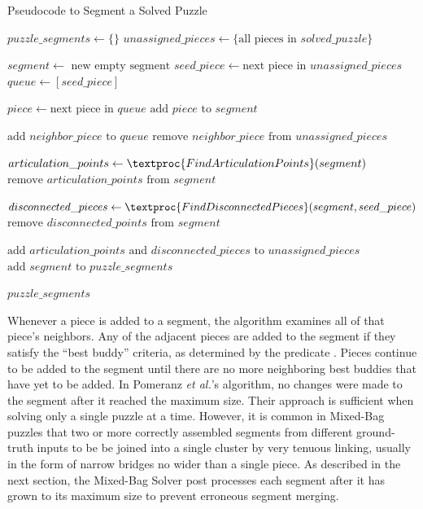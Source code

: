 \begin{algorithm}[tb]
\caption{Pseudocode to Segment a Solved Puzzle}\label{alg:segmentPuzzle}
\begin{algorithmic}[1]
    \State $puzzle\_segments \gets \{ \}$
    \State $unassigned\_pieces \gets \{ \text{all pieces in } solved\_puzzle \}$
\item[]
        \State $segment \gets \text{ new empty segment}$
        \State $seed\_piece \gets \text{next piece in } unassigned\_pieces$
        \State $queue \gets [seed\_piece]$
\item[]
            \State $piece \gets \text{next piece in } queue$
            \State $\text{add } piece \text{ to } segment$
\item[]
            		\State $\text{add } neighbor\_piece \text{ to } \textit{queue}$
            		\State $\text{remove } neighbor\_piece \text{ from } unassigned\_pieces$
            	\EndIf
            \EndFor
        \EndWhile
\item[]
        \State $articulation\_points \gets \textproc{FindArticulationPoints}(segment)$
        \State $\text{remove } articulation\_points \text{ from } \textit{segment}$
\item[]
		\State $disconnected\_pieces \gets \textproc{FindDisconnectedPieces}(segment, seed\_piece)$ 
		\State $\text{remove } disconnected\_points \text{ from } segment$
\item[]
        \State $\text{add } \textit{articulation\_points} \text{ and } \textit{disconnected\_pieces} \text{ to } \textit{unassigned\_pieces}$               	
		\State $\text{add } segment \text{ to } puzzle\_segments$	
    \EndWhile
\item[]
    \State \Return $puzzle\_segments$
\EndFunction
\end{algorithmic}
\end{algorithm}

Whenever a piece is added to a segment, the algorithm examines all of that piece's neighbors.  Any of the adjacent pieces are added to the segment if they satisfy the ``best buddy'' criteria, as determined by the predicate .  Pieces continue to be added to the segment until there are no more neighboring best buddies that have yet to be added. In Pomeranz \textit{et al.}'s algorithm, no changes were made to the segment after it reached the maximum size.  Their approach is sufficient when solving only a single puzzle at a time.  However, it is common in Mixed-Bag puzzles that two or more correctly assembled segments from different ground-truth inputs to be be joined into a single cluster by very tenuous linking, usually in the form of narrow bridges no wider than a single piece.  As described in the next section, the Mixed-Bag Solver post processes each segment after it has grown to its maximum size to prevent erroneous segment merging.

